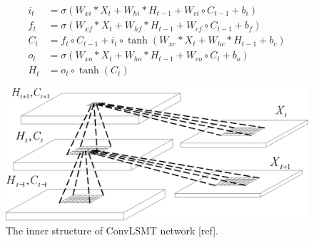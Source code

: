 \begin{equation}
\label{equation:convlstm}
\begin{aligned}
i_t &= \sigma(W_{xi}*X_t + W_{hi}*H_{t-1} + W_{ci}\circ C_{t-1} + b_i) \\
f_t &= \sigma(W_{xf}*X_t + W_{hf}*H_{t-1} + W_{cf}\circ C_{t-1} + b_f) \\
C_t &= f_t\circ C_{t-1} + i_t\circ \tanh(W_{xc}*X_t + W_{hc}*H_{t-1} + b_c) \\
o_t &= \sigma(W_{xo}*X_t + W_{ho}*H_{t-1} + W_{co}\circ C_{t} + b_o) \\
H_t &= o_t \circ \tanh(C_t)
\end{aligned}
\end{equation}

\begin{figure}
\centering
		\includegraphics[width=0.8\columnwidth]{preliminaries_figs/ConvLSTM_model.eps}
		\caption{The inner structure of ConvLSMT network [ref]. 
        \label{fig:ConvLSTM_model}}
\end{figure}